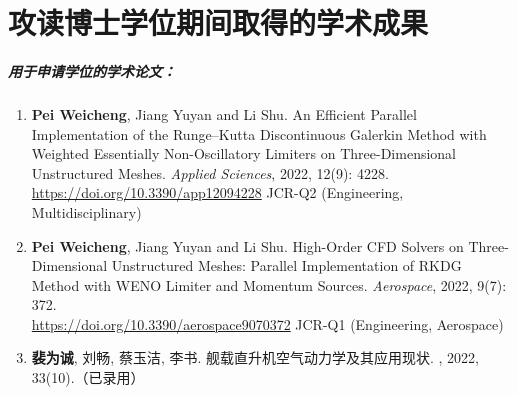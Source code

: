 \documentclass[doctor,openright,twoside,color,AutoFakeBold=true]{buaathesis}
\theoremstyle{plain}
\theoremstyle{definition}
\theoremstyle{plain}
\theoremstyle{plain}
\theoremstyle{remark}
\theoremstyle{remark}
\theoremstyle{definition}
\theoremstyle{plain}
\theoremstyle{definition}
\theoremstyle{plain}
\theoremstyle{plain}
\theoremstyle{remark}
\theoremstyle{plain}
\theoremstyle{definition}
\theoremstyle{remark}
\theoremstyle{plain}
\theoremstyle{remark}
\theoremstyle{definition}
\theoremstyle{plain}
\theoremstyle{plain}
\theoremstyle{definition}
\theoremstyle{plain}
\theoremstyle{plain}
\theoremstyle{definition}
\begin{document}
\begingroup
\renewcommand\citet[2][]{}
\renewcommand\upcite[2][]{}
\listoffigures
\listoftables
\endgroup
\printnomenclature
%

\mainmatter
\pagestyle{mainmatter}




\cleardoublepage
{}
{}

\cleardoublepage

\appendix
%

\backmatter

\chapter{攻读博士学位期间取得的学术成果}
\paragraph*{用于申请学位的学术论文：}
\begin{enumerate}
\item
\textbf{Pei Weicheng}, Jiang Yuyan and Li Shu. An Efficient Parallel Implementation of the Runge–Kutta Discontinuous Galerkin Method with Weighted Essentially Non-Oscillatory Limiters on Three-Dimensional Unstructured Meshes. \textit{Applied Sciences}, 2022, 12(9): 4228.\\
\url{https://doi.org/10.3390/app12094228} JCR-Q2 (Engineering, Multidisciplinary)

\item
\textbf{Pei Weicheng}, Jiang Yuyan and Li Shu. High-Order CFD Solvers on Three-Dimensional Unstructured Meshes: Parallel Implementation of RKDG Method with WENO Limiter and Momentum Sources. \textit{Aerospace}, 2022, 9(7): 372.\\
\url{https://doi.org/10.3390/aerospace9070372} JCR-Q1 (Engineering, Aerospace)

\item
\textbf{裴为诚}, 刘畅, 蔡玉洁, 李书. 舰载直升机空气动力学及其应用现状. , 2022, 33(10).（已录用）
\end{enumerate}
\end{document}
